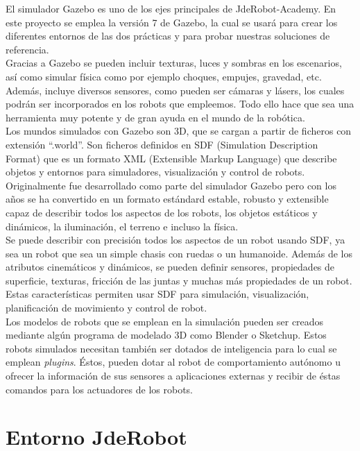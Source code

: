 El simulador Gazebo es uno de los ejes principales de JdeRobot-Academy. En este proyecto se emplea la versión 7 de Gazebo, la cual se usará para crear los diferentes entornos de las dos prácticas y para probar nuestras soluciones de referencia.\\

Gracias a Gazebo se pueden incluir texturas, luces y sombras en los escenarios, así como simular física como por ejemplo choques, empujes, gravedad, etc. Además, incluye diversos sensores, como pueden ser cámaras y lásers, los cuales podrán ser incorporados en los robots que empleemos. Todo ello hace que sea una herramienta muy potente y de gran ayuda en el mundo de la robótica.\\

Los mundos simulados con Gazebo son 3D, que se cargan a partir de ficheros con extensión ``.world''. Son ficheros definidos en SDF (Simulation Description Format) que es un formato XML (Extensible Markup Language) que describe objetos y entornos para simuladores, visualización y control de robots. Originalmente fue desarrollado como parte del simulador Gazebo pero con los años se ha convertido en un formato estándard estable, robusto y extensible capaz de describir todos los aspectos de los robots, los objetos estáticos y dinámicos, la iluminación, el terreno e incluso la física.\\

Se puede describir con precisión todos los aspectos de un robot usando SDF, ya sea un robot que sea un simple chasis con ruedas o un humanoide. Además de los atributos cinemáticos y dinámicos, se pueden definir sensores, propiedades de superficie, texturas, fricción de las juntas y muchas más propiedades de un robot. Estas características permiten usar SDF para simulación, visualización, planificación de movimiento y control de robot.\\

Los modelos de robots que se emplean en la simulación pueden ser creados mediante algún programa de modelado 3D como Blender o Sketchup. Estos robots simulados necesitan también ser dotados de inteligencia para lo cual se emplean \textit{plugins}. Éstos, pueden dotar al robot de comportamiento autónomo u ofrecer la información de sus sensores a aplicaciones externas y recibir de éstas comandos para los actuadores de los robots.


\section{Entorno JdeRobot}

